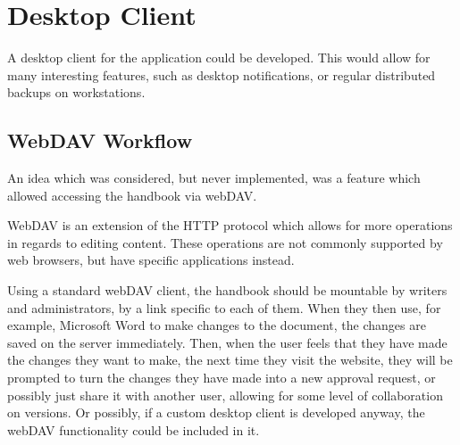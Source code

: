 \documentclass[../../master.tex]{subfiles}
\begin{document}
\section{Desktop Client}
A desktop client for the application could be developed.
This would allow for many interesting features, such as desktop notifications, or regular distributed backups on workstations.
\subsection{WebDAV Workflow}
An idea which was considered, but never implemented, was a feature which allowed accessing the handbook via webDAV.

WebDAV is an extension of the HTTP protocol which allows for more operations in regards to editing content.
These operations are not commonly supported by web browsers, but have specific applications instead.

Using a standard webDAV client, the handbook should be mountable by writers and administrators, by a link specific to each of them.
When they then use, for example, Microsoft Word to make changes to the document, the changes are saved on the server immediately.
Then, when the user feels that they have made the changes they want to make, the next time they visit the website, they will be prompted to turn the changes they have made into a new approval request, or possibly just share it with another user, allowing for some level of collaboration on versions.
Or possibly, if a custom desktop client is developed anyway, the webDAV functionality could be included in it.
\end{document}
